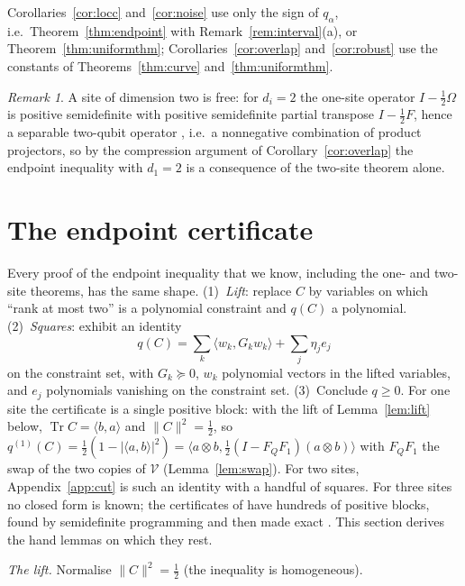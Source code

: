 \documentclass[aps,pra,twocolumn,superscriptaddress,nofootinbib,longbibliography]{revtex4-2}
\newcommand{\V}{\mathcal V}
\newcommand{\ip}[2]{\langle #1,#2\rangle}
\newcommand{\Om}{\Omega}
\DeclareMathOperator{\Tr}{Tr}
\theoremstyle{plain}
\theoremstyle{definition}
\theoremstyle{remark}
\newtheorem{remark}[theorem]{Remark}
\begin{document}
Corollaries~\ref{cor:locc} and~\ref{cor:noise} use only the sign of $q_\alpha$, i.e.\ Theorem~\ref{thm:endpoint} with Remark~\ref{rem:interval}(a), or Theorem~\ref{thm:uniformthm}; Corollaries~\ref{cor:overlap} and~\ref{cor:robust} use the constants of Theorems~\ref{thm:curve} and~\ref{thm:uniformthm}.

\begin{remark}\label{rem:qubit}
A site of dimension two is free: for $d_i=2$ the one-site operator $I-\tfrac12\Om$ is positive semidefinite with positive semidefinite partial transpose $I-\tfrac12F$, hence a separable two-qubit operator \cite{Peres,HHH96}, i.e.\ a nonnegative combination of product projectors, so by the compression argument of Corollary~\ref{cor:overlap} the endpoint inequality with $d_1=2$ is a consequence of the two-site theorem alone.
\end{remark}

\section{The endpoint certificate}\label{sec:certificate}

Every proof of the endpoint inequality that we know, including the one- and two-site theorems, has the same shape. (1)~\emph{Lift}: replace $C$ by variables on which ``rank at most two'' is a polynomial constraint and $q(C)$ a polynomial. (2)~\emph{Squares}: exhibit an identity
\begin{equation}\label{eq:template}
q(C)=\sum_k\ip{w_k}{G_kw_k}+\sum_j\eta_je_j
\end{equation}
on the constraint set, with $G_k\succeq0$, $w_k$ polynomial vectors in the lifted variables, and $e_j$ polynomials vanishing on the constraint set. (3)~Conclude $q\ge0$. For one site the certificate is a single positive block: with the lift of Lemma~\ref{lem:lift} below, $\Tr C=\ip ba$ and $\|C\|^2=\tfrac12$, so
$q^{(1)}(C)=\tfrac12(1-|\ip ab|^2)=\ip{a\otimes b}{\tfrac12(I-F_QF_1)(a\otimes b)}$ with $F_QF_1$ the swap of the two copies of $\V$ (Lemma~\ref{lem:swap}). For two sites, Appendix~\ref{app:cut} is such an identity with a handful of squares. For three sites no closed form is known; the certificates of \cite{Zenodo,Liu} have hundreds of positive blocks, found by semidefinite programming and then made exact \cite{PeyrlParrilo}. This section derives the hand lemmas on which they rest.

\emph{The lift.} Normalise $\|C\|^2=\tfrac12$ (the inequality is homogeneous).
\end{document}

